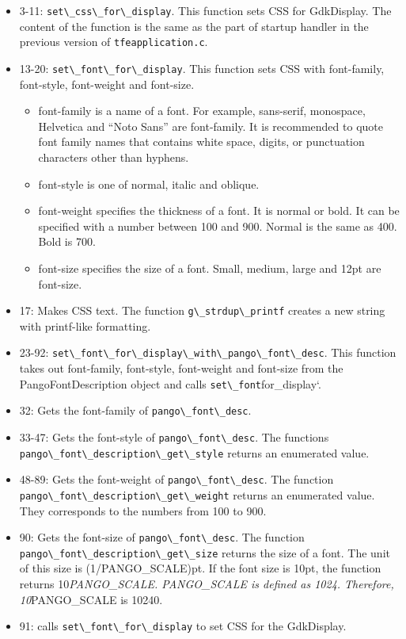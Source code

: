 \begin{itemize}
\tightlist
\item
  3-11: \passthrough{\lstinline!set\_css\_for\_display!}. This function
  sets CSS for GdkDisplay. The content of the function is the same as
  the part of startup handler in the previous version of
  \passthrough{\lstinline!tfeapplication.c!}.
\item
  13-20: \passthrough{\lstinline!set\_font\_for\_display!}. This
  function sets CSS with font-family, font-style, font-weight and
  font-size.

  \begin{itemize}
  \tightlist
  \item
    font-family is a name of a font. For example, sans-serif, monospace,
    Helvetica and ``Noto Sans'' are font-family. It is recommended to
    quote font family names that contains white space, digits, or
    punctuation characters other than hyphens.
  \item
    font-style is one of normal, italic and oblique.
  \item
    font-weight specifies the thickness of a font. It is normal or bold.
    It can be specified with a number between 100 and 900. Normal is the
    same as 400. Bold is 700.
  \item
    font-size specifies the size of a font. Small, medium, large and
    12pt are font-size.
  \end{itemize}
\item
  17: Makes CSS text. The function
  \passthrough{\lstinline!g\_strdup\_printf!} creates a new string with
  printf-like formatting.
\item
  23-92:
  \passthrough{\lstinline!set\_font\_for\_display\_with\_pango\_font\_desc!}.
  This function takes out font-family, font-style, font-weight and
  font-size from the PangoFontDescription object and calls
  \passthrough{\lstinline!set\_font!}for\_display`.
\item
  32: Gets the font-family of
  \passthrough{\lstinline!pango\_font\_desc!}.
\item
  33-47: Gets the font-style of
  \passthrough{\lstinline!pango\_font\_desc!}. The functions
  \passthrough{\lstinline!pango\_font\_description\_get\_style!} returns
  an enumerated value.
\item
  48-89: Gets the font-weight of
  \passthrough{\lstinline!pango\_font\_desc!}. The function
  \passthrough{\lstinline!pango\_font\_description\_get\_weight!}
  returns an enumerated value. They corresponds to the numbers from 100
  to 900.
\item
  90: Gets the font-size of \passthrough{\lstinline!pango\_font\_desc!}.
  The function
  \passthrough{\lstinline!pango\_font\_description\_get\_size!} returns
  the size of a font. The unit of this size is (1/PANGO\_SCALE)pt. If
  the font size is 10pt, the function returns 10\emph{PANGO\_SCALE.
  PANGO\_SCALE is defined as 1024. Therefore, 10}PANGO\_SCALE is 10240.
\item
  91: calls \passthrough{\lstinline!set\_font\_for\_display!} to set CSS
  for the GdkDisplay.
\end{itemize}

